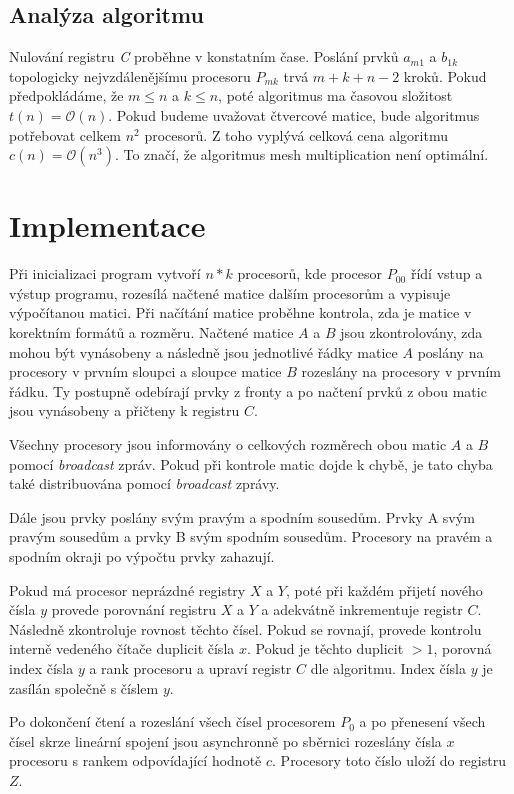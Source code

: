\documentclass[11pt,a4paper]{article}
\begin{document}
\subsection{Analýza algoritmu}
Nulování registru \textit{C} proběhne v konstatním čase. Poslání prvků $a_{m1}$ a $b_{1k}$ topologicky nejvzdálenějšímu procesoru $P_{mk}$ trvá $m+k+n - 2$ kroků. Pokud předpokládáme, že $m \leq n$ a $k \leq n$, poté algoritmus ma časovou složitost $t(n) = \mathcal{O}(n)$. Pokud budeme uvažovat čtvercové matice, bude algoritmus potřebovat celkem $n^2$ procesorů. Z toho vyplývá celková cena algoritmu $c(n) = \mathcal{O}(n^3)$. To značí, že algoritmus mesh multiplication není optimální.

\section{Implementace}

Při inicializaci program vytvoří $n*k$ procesorů, kde procesor $P_{00}$ řídí vstup a výstup programu, rozesílá načtené matice dalším procesorům a vypisuje výpočítanou matici. Při načítání matice proběhne kontrola, zda je matice v korektním formátů a rozměru. Načtené matice $A$ a $B$ jsou zkontrolovány, zda mohou být vynásobeny a následně jsou jednotlivé řádky matice $A$ poslány na procesory v prvním sloupci a sloupce matice $B$ rozeslány na procesory v prvním řádku. Ty postupně odebírají prvky z fronty a po načtení prvků z obou matic jsou vynásobeny a přičteny k registru $C$.

Všechny procesory jsou informovány o celkových rozměrech obou matic $A$ a $B$ pomocí \textit{broadcast} zpráv. Pokud při kontrole matic dojde k chybě, je tato chyba také distribuována pomocí \textit{broadcast} zprávy.

Dále jsou prvky poslány svým pravým a spodním sousedům. Prvky A svým pravým sousedům a prvky B svým spodním sousedům. Procesory na pravém a spodním okraji po výpočtu prvky zahazují.

Pokud má procesor neprázdné registry $X$ a $Y$, poté při každém přijetí nového čísla $y$ provede porovnání registru $X$ a $Y$ a adekvátně inkrementuje registr $C$. Následně zkontroluje rovnost těchto čísel. Pokud se rovnají, provede kontrolu interně vedeného čítače duplicit čísla $x$. Pokud je těchto duplicit $>1$, porovná index čísla $y$ a rank procesoru a upraví registr $C$ dle algoritmu. Index čísla $y$ je zasílán společně s číslem $y$.

Po dokončení čtení a rozeslání všech čísel procesorem $P_0$ a po přenesení všech čísel skrze lineární spojení jsou asynchronně po sběrnici rozeslány čísla $x$ procesoru s rankem odpovídající hodnotě $c$. Procesory toto číslo uloží do registru $Z$.
\end{document}
